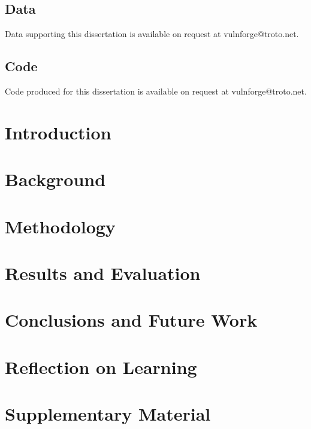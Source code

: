 \section{Data}
Data supporting this dissertation is available on request at vulnforge@troto.net.

\section{Code}
Code produced for this dissertation is available on request at vulnforge@troto.net.

\mainmatter

\chapter{Introduction}\label{ch1}


\chapter{Background}\label{ch2}


\chapter{Methodology}\label{ch3}


\chapter{Results and Evaluation}\label{ch4}


\chapter{Conclusions and Future Work}\label{ch5}


\chapter{Reflection on Learning}\label{ch6}


\backmatter

\appendix
\chapter{Supplementary Material}\label{app:supp}




